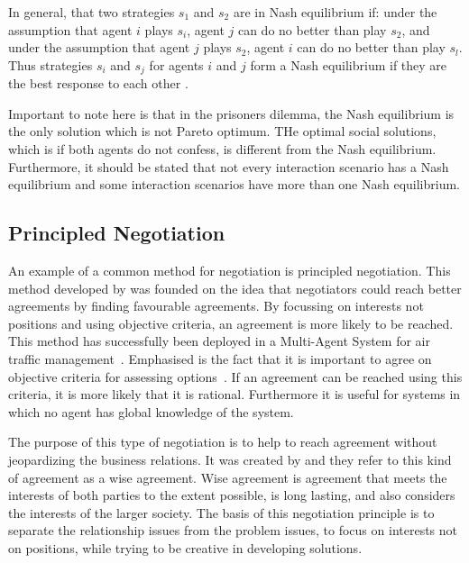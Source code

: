 In general, that two strategies $s_1$ and $s_2$ are in Nash equilibrium if: under the assumption that agent $i$ plays $s_i$, agent $j$ can do no better than play $s_2$, and under the assumption that agent $j$ plays $s_2$, agent $i$ can do no better than play $s_l$. Thus strategies $s_i$ and $s_j$ for agents $i$ and $j$ form a Nash equilibrium if they are the best response to each other  \cite{wooldridge2009introduction}. 

Important to note here is that in the prisoners dilemma, the Nash equilibrium is the only solution which is not Pareto optimum.  THe optimal social solutions, which is if both agents do not confess, is different from the Nash equilibrium.  Furthermore, it should be stated that not every interaction scenario has a Nash equilibrium and some interaction scenarios have more than one Nash equilibrium. 
\subsection{Principled Negotiation}
An example of a common method for negotiation is principled negotiation. This method developed by \citet{fisher1987getting} was founded on the idea that negotiators could reach better agreements by finding favourable agreements. By focussing on interests not positions and using objective criteria, an agreement is more likely to be reached. This method has successfully been deployed in a Multi-Agent System for air traffic management~\citep{wangermann1998principled}. Emphasised is the fact that it is important to agree on objective criteria for assessing options~\citep{fisher1987getting}. If an agreement can be reached using this criteria, it is more likely that it is rational. Furthermore it is useful for systems in which no agent has global knowledge of the system. 

The purpose of this type of negotiation is to help to reach agreement without jeopardizing the business relations. It was created by \citet{fisher1987getting} and they refer to this kind of agreement as a wise agreement. Wise agreement is agreement that meets the interests of both parties to the extent possible, is long lasting, and also considers the interests of the larger society. The basis of this negotiation principle is to separate the relationship issues from the problem issues, to focus on interests not on positions, while trying to be creative in developing solutions.







